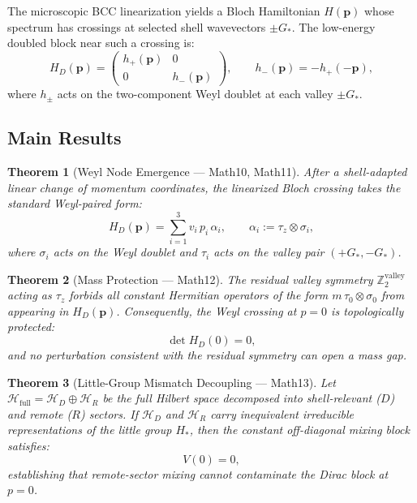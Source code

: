 \documentclass[reprint,aps,pre,onecolumn,superscriptaddress,amsmath,amssymb]{revtex4-2}
\newcommand{\Gstar}{G_{*}}
\newtheorem{theorem}{Theorem}[section]
\begin{document}
The microscopic BCC linearization yields a Bloch Hamiltonian $H(\mathbf{p})$
whose spectrum has crossings at selected shell wavevectors $\pm\Gstar$.
The low-energy doubled block near such a crossing is:
\begin{equation}
  H_{D}(\mathbf{p})
  =
  \begin{pmatrix}
    h_{+}(\mathbf{p}) & 0 \\
    0 & h_{-}(\mathbf{p})
  \end{pmatrix},
  \qquad
  h_{-}(\mathbf{p}) = -h_{+}(-\mathbf{p}),
  \label{eq:valley-pair}
\end{equation}
where $h_{\pm}$ acts on the two-component Weyl doublet at each valley $\pm\Gstar$.

\subsection{Main Results}

\begin{theorem}[Weyl Node Emergence --- Math10, Math11]
  \label{thm:Weyl}
  After a shell-adapted linear change of momentum coordinates, the linearized
  Bloch crossing takes the standard Weyl-paired form:
  \begin{equation}
    H_{D}(\mathbf{p})
    = \sum_{i=1}^{3} v_{i}\,p_{i}\,\alpha_{i},
    \qquad
    \alpha_{i} := \tau_{z} \otimes \sigma_{i},
    \label{eq:Weyl-form}
  \end{equation}
  where $\sigma_{i}$ acts on the Weyl doublet and $\tau_{i}$ acts on the valley pair
  $(+\Gstar, -\Gstar)$.
\end{theorem}

\begin{theorem}[Mass Protection --- Math12]
  \label{thm:mass-protect}
  The residual valley symmetry $\mathbb{Z}_{2}^{\mathrm{valley}}$ acting as
  $\tau_{z}$ forbids all constant Hermitian operators of the form $m\,\tau_{0}\otimes\sigma_{0}$
  from appearing in $H_{D}(\mathbf{p})$.
  Consequently, the Weyl crossing at $p = 0$ is topologically protected:
  \begin{equation}
    \det H_{D}(0) = 0,
    \label{eq:mass-zero}
  \end{equation}
  and no perturbation consistent with the residual symmetry can open a mass gap.
\end{theorem}

\begin{theorem}[Little-Group Mismatch Decoupling --- Math13]
  \label{thm:LG-mismatch}
  Let $\mathcal{H}_{\mathrm{full}} = \mathcal{H}_{D} \oplus \mathcal{H}_{R}$
  be the full Hilbert space decomposed into shell-relevant ($D$) and remote ($R$) sectors.
  If $\mathcal{H}_{D}$ and $\mathcal{H}_{R}$ carry inequivalent irreducible
  representations of the little group $H_{*}$, then the constant off-diagonal
  mixing block satisfies:
  \begin{equation}
    V(0) = 0,
    \label{eq:V-zero}
  \end{equation}
  establishing that remote-sector mixing cannot contaminate the Dirac block at $p=0$.
\end{theorem}
\end{document}
